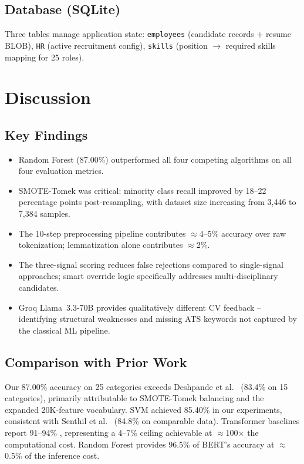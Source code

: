 \documentclass[10pt,twocolumn]{article}
\begin{document}
\subsection{Database (SQLite)}

Three tables manage application state: \texttt{employees} (candidate records + resume BLOB), \texttt{HR} (active recruitment config), \texttt{skills} (position $\to$ required skills mapping for 25 roles).

\section{Discussion}

\subsection{Key Findings}

\begin{itemize}
  \item Random Forest (87.00\%) outperformed all four competing algorithms on all four evaluation metrics.
  \item SMOTE-Tomek was critical: minority class recall improved by 18--22 percentage points post-resampling, with dataset size increasing from 3,446 to 7,384 samples.
  \item The 10-step preprocessing pipeline contributes $\approx$4--5\% accuracy over raw tokenization; lemmatization alone contributes $\approx$2\%.
  \item The three-signal scoring reduces false rejections compared to single-signal approaches; smart override logic specifically addresses multi-disciplinary candidates.
  \item Groq Llama~3.3-70B provides qualitatively different CV feedback -- identifying structural weaknesses and missing ATS keywords not captured by the classical ML pipeline.
\end{itemize}

\subsection{Comparison with Prior Work}

Our 87.00\% accuracy on 25 categories exceeds Deshpande et al.\ \cite{deshpande2020} (83.4\% on 15 categories), primarily attributable to SMOTE-Tomek balancing and the expanded 20K-feature vocabulary. SVM achieved 85.40\% in our experiments, consistent with Senthil et al.\ \cite{senthil2022} (84.8\% on comparable data). Transformer baselines report 91--94\% \cite{chowdhury2023}, representing a 4--7\% ceiling achievable at $\approx$100$\times$ the computational cost. Random Forest provides 96.5\% of BERT's accuracy at $\approx$0.5\% of the inference cost.
\end{document}
